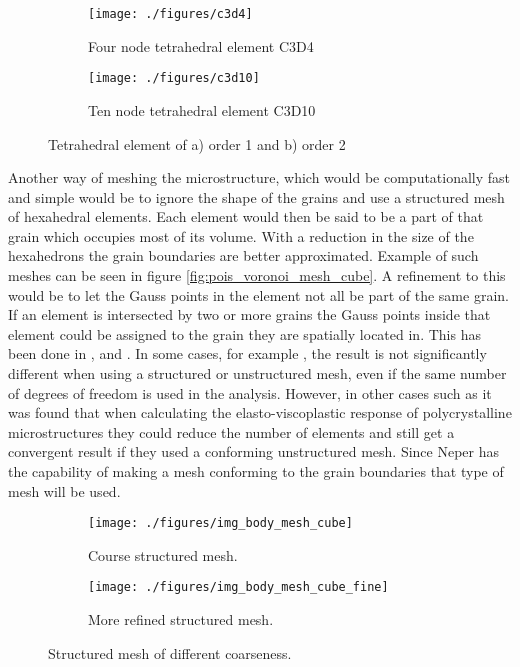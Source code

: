 \documentclass[meshing_micro.tex]{subfiles}
\begin{document}
\begin{figure}
\centering
\begin{subfigure}[b]{.5\textwidth}
  \centering
  \texttt{[image: ./figures/c3d4]}
  \caption{Four node tetrahedral element C3D4}
  \label{fig:mesh_a}
\end{subfigure}%
\begin{subfigure}[b]{.5\textwidth}
  \centering
  \texttt{[image: ./figures/c3d10]}
  \caption{Ten node tetrahedral element C3D10}
  \label{fig:mesh_b}
\end{subfigure}
\caption{Tetrahedral element of a) order 1 and b) order 2}
\label{fig:mesh}
\end{figure}



Another way of meshing the microstructure, which would be computationally fast and simple would be to ignore the shape of the grains and use a structured mesh of hexahedral elements. Each element would then be said to be a part of that grain which occupies most of its volume. With a reduction in the size of the hexahedrons the grain boundaries are better approximated.   Example of such meshes can be seen in figure \ref{fig:pois_voronoi_mesh_cube}. A refinement to this would be to let the Gauss points in the element not all be part of the same grain. If an element is intersected by two or more grains the Gauss points inside that element could be assigned to the grain they are spatially located in. This has been done in \cite{Nygards20031049}, \cite{Cailletaud2003351} and \cite{Barbe2001513}. In some cases, for example \cite{Bohlke201011}, the result is not significantly different when using a structured or unstructured mesh, even if the same number of degrees of freedom is used in the analysis. However, in other cases such as \cite{Li20091163} it was found that when calculating the elasto-viscoplastic response of polycrystalline microstructures they could reduce the number of elements and still get a convergent result if they used a conforming unstructured mesh. Since Neper has the capability of making a mesh conforming to the grain boundaries that type of mesh will be used. 


\begin{figure}
\centering
\begin{subfigure}[b]{.5\textwidth}
  \centering
  \texttt{[image: ./figures/img\_body\_mesh\_cube]}
  \caption{Course structured mesh.}
  \label{fig:mesh_a}
\end{subfigure}%
\begin{subfigure}[b]{.5\textwidth}
  \centering
  \texttt{[image: ./figures/img\_body\_mesh\_cube\_fine]}
  \caption{More refined structured mesh.}
  \label{fig:mesh_b}
\end{subfigure}
\caption{Structured mesh of different coarseness.}
\label{fig:mesh}
\end{figure}
\end{document}
